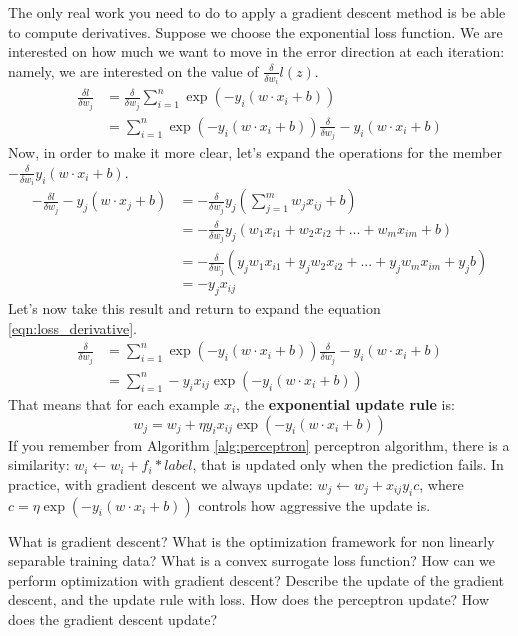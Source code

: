 The only real work you need to do to apply a gradient descent method is be able to compute derivatives. Suppose we choose the exponential loss function. We are interested on how much we want to move in the error direction at each iteration: namely, we are interested on the value of \(\frac \delta {\delta w_i} l(z)\).
\begin{align}
    \label{eqn:loss_derivative}
    \frac {\delta l} {\delta w_j} &= \frac \delta {\delta w_j} \sum_{i=1}^n \exp (-y_i (w \cdot x_i + b)) \\
    &= \sum_{i=1}^n \exp (-y_i (w \cdot x_i + b)) \frac \delta {\delta w_j} -y_i (w \cdot x_i + b)
\end{align}
Now, in order to make it more clear, let's expand the operations for the member \(- \frac \delta {\delta w_i} y_i(w \cdot x_i + b)\).
\begin{align*}
    - \frac {\delta l} {\delta w_j} -y_j (w \cdot x_j + b) &= - \frac \delta {\delta w_j} y_j (\sum_{j=1}^m w_j x_{ij} + b)\\
    &= -\frac \delta {\delta w_j} y_j (w_1 x_{i1} + w_2 x_{i2} + ... + w_m x_{im} + b) \\
    &= -\frac \delta {\delta w_j} (y_j w_1 x_{i1} + y_j w_2 x_{i2} + ... + y_j w_m x_{im} + y_j b) \\
    &= -y_j x_{ij}
\end{align*}
Let's now take this result and return to expand the equation \ref{eqn:loss_derivative}.
\begin{align}
    \frac \delta {\delta w_j} &= \sum_{i=1}^n \exp (-y_i (w \cdot x_i + b)) \frac \delta {\delta w_j} -y_i (w \cdot x_i + b) \\
    &= \sum_{i=1}^n -y_i x_{ij} \exp (-y_i (w \cdot x_i + b))
\end{align}
That means that for each example \(x_i\), the \textbf{exponential update rule} is:
\begin{equation}
    w_j = w_j + \eta y_i x_{ij} \exp(-y_i (w \cdot x_i + b))
\end{equation}
If you remember from Algorithm \ref{alg:perceptron} perceptron algorithm, there is a similarity: \(w_i \gets w_i + f_i*label\), that is updated only when the prediction fails. In practice, with gradient descent we always update: \(w_j \gets w_j + x_{ij} y_i c\), where \(c = \eta \exp(-y_i (w \cdot x_i + b))\) controls how aggressive the update is.

\newpage
\begin{exercise}[topsep=20pt,itemsep=10pt]
    \ex[!] What is gradient descent?
    \ex What is the optimization framework for non linearly separable training data?
    \ex What is a convex surrogate loss function?
    \ex How can we perform optimization with gradient descent?
    \ex[!] Describe the update of the gradient descent, and the update rule with loss.
    \ex[!] How does the perceptron update? How does the gradient descent update?
\end{exercise}